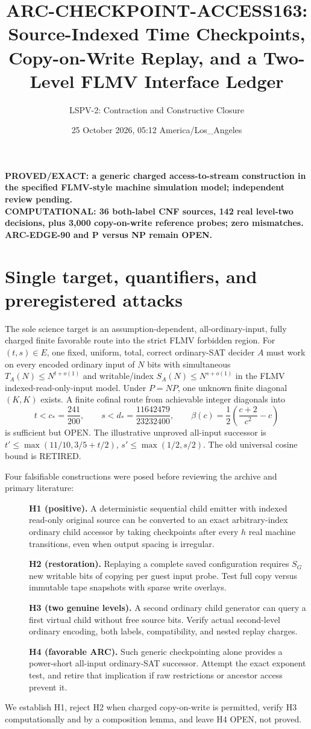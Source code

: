 \documentclass[11pt]{article}
\title{ARC-CHECKPOINT-ACCESS163: Source-Indexed Time Checkpoints,\\
Copy-on-Write Replay, and a Two-Level FLMV Interface Ledger}
\author{LSPV-2: Contraction and Constructive Closure}
\date{25 October 2026, 05:12 America/Los\_Angeles}
\begin{document}
\maketitle
\begin{center}
\textbf{PROVED/EXACT: a generic charged access-to-stream construction in the specified
FLMV-style machine simulation model; independent review pending.}\\
\textbf{COMPUTATIONAL: 36 both-label CNF sources, 142 real level-two decisions,
plus 3,000 copy-on-write reference probes; zero mismatches.}\\
\textbf{ARC-EDGE-90 and P versus NP remain OPEN.}
\end{center}

\section{Single target, quantifiers, and preregistered attacks}
The sole science target is an assumption-dependent, all-ordinary-input,
fully charged finite favorable route into the strict FLMV forbidden region.
For $(t,s)\in E$, one fixed, uniform, total, correct ordinary-SAT decider
$A$ must work on every encoded ordinary input of $N$ bits with simultaneous
$T_A(N)\le N^{t+o(1)}$ and writable/index
$S_A(N)\le N^{s+o(1)}$ in the FLMV indexed-read-only-input model.
Under $P=NP$, one unknown finite diagonal $(K,K)$ exists.
A finite cofinal route from achievable integer diagonals into
\[
t<c_*=\frac{241}{200},\qquad
s<d_*=\frac{11642479}{23232400},\qquad
\beta(c)=\frac12\left(\frac{c+2}{c^2}-c\right)
\]
is sufficient but OPEN. The illustrative unproved all-input successor is
$t'\le\max(11/10,3/5+t/2)$,
$s'\le\max(1/2,s/2)$. The old universal cosine bound is RETIRED.

Four falsifiable constructions were posed before reviewing the archive and primary literature:
\begin{description}
\item[] \textbf{H1 (positive).} A deterministic sequential child emitter with
indexed read-only original source can be converted to an exact arbitrary-index
ordinary child accessor by taking checkpoints after every $h$ real machine
transitions, even when output spacing is irregular.
\item[] \textbf{H2 (restoration).} Replaying a complete saved configuration
requires $S_G$ new writable bits of copying per guest input probe.
Test full copy versus immutable tape snapshots with sparse write overlays.
\item[] \textbf{H3 (two genuine levels).} A second ordinary child generator can
query a first virtual child without free source bits. Verify actual second-level
ordinary encoding, both labels, compatibility, and nested replay charges.
\item[] \textbf{H4 (favorable ARC).} Such generic checkpointing alone provides a
power-short all-input ordinary-SAT successor. Attempt the exact exponent test,
and retire that implication if raw restrictions or ancestor access prevent it.
\end{description}
We establish H1, reject H2 when charged copy-on-write is permitted, verify H3
computationally and by a composition lemma, and leave H4 OPEN, not proved.
\end{document}
